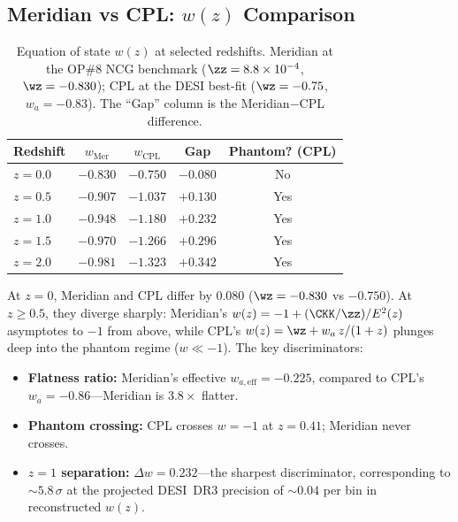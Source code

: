 \subsection{Meridian vs CPL: \texorpdfstring{$w(z)$}{w(z)} Comparison}
\label{sec:2-DR3-wz}

\begin{table}[htbp]
\centering
\caption{Equation of state $w(z)$ at selected redshifts. Meridian at the OP\#8 NCG benchmark ($\zz = 8.8 \times 10^{-4}$, $\wz = -0.830$); CPL at the DESI best-fit ($\wz = -0.75$, $w_a = -0.83$). The ``Gap'' column is the Meridian$-$CPL difference.}
\label{tab:2-Mer-CPL-wz}
\begin{tabular}{@{}lcccc@{}}
\toprule
Redshift & $w_\mathrm{Mer}$ & $w_\mathrm{CPL}$ & Gap & Phantom? (CPL) \\
\midrule
$z = 0.0$ & $-0.830$ & $-0.750$ & $-0.080$ & No \\
$z = 0.5$ & $-0.907$ & $-1.037$ & $+0.130$ & Yes \\
$z = 1.0$ & $-0.948$ & $-1.180$ & $+0.232$ & Yes \\
$z = 1.5$ & $-0.970$ & $-1.266$ & $+0.296$ & Yes \\
$z = 2.0$ & $-0.981$ & $-1.323$ & $+0.342$ & Yes \\
\bottomrule
\end{tabular}
\end{table}

At $z = 0$, Meridian and CPL differ by $0.080$ ($\wz = -0.830$ vs $-0.750$). At $z \geq 0.5$, they diverge sharply: Meridian's $w(z) = -1 + (\CKK/\zz)/E^2(z)$ asymptotes to $-1$ from above, while CPL's $w(z) = \wz + w_a\,z/(1+z)$ plunges deep into the phantom regime ($w \ll -1$). The key discriminators:
\begin{itemize}
\item \textbf{Flatness ratio:} Meridian's effective $w_{a,\mathrm{eff}} = -0.225$, compared to CPL's $w_a = -0.86$---Meridian is $3.8\times$ flatter.
\item \textbf{Phantom crossing:} CPL crosses $w = -1$ at $z = 0.41$; Meridian never crosses.
\item \textbf{$z = 1$ separation:} $\Delta w = 0.232$---the sharpest discriminator, corresponding to $\sim\!5.8\,\sigma$ at the projected DESI~DR3 precision of $\sim\!0.04$ per bin in reconstructed $w(z)$.
\end{itemize}


%

